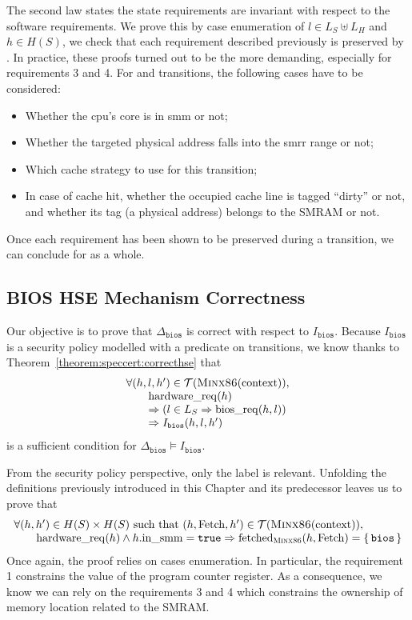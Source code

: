 The second law states the state requirements are invariant with respect to the
software requirements.
%
We prove this by case enumeration of \( l \in L_S \uplus L_H \) and
\( h \in H(S) \), we check that each requirement described
previously is preserved by .
%
In practice, these proofs turned out to be the more demanding, especially for
requirements 3 and 4.
%
For  and  transitions, the following cases have to be
considered:
%
\begin{itemize}
\item Whether the \ac{cpu}'s core is in \ac{smm} or not;
\item Whether the targeted physical address falls into the \ac{smrr} range or
  not;
\item Which cache strategy to use for this transition;
\item In case of cache hit, whether the occupied cache line is tagged ``dirty''
  or not, and whether its tag (a physical address) belongs to the SMRAM or not.
\end{itemize}
%
Once each requirement has been shown to be preserved during a transition, we can
conclude for  as a whole.

\subsection{BIOS HSE Mechanism Correctness}

Our objective is to prove that \( \Delta_{\mathtt{bios}} \) is correct with
respect to \( I_{\mathtt{bios}} \).
%
Because \( I_{\mathtt{bios}} \) is a security policy modelled with a predicate
on transitions, we know thanks to Theorem~\ref{theorem:speccert:correcthse} that
%
\[
  \begin{array}{l}
    \forall (h, l, h') \in \mathcal{T}(\textsc{Minx86}(\mathrm{context})), \\
    \qquad \mathrm{hardware\_req}(h) \\
    \qquad \Rightarrow (l \in L_S \Rightarrow \mathrm{bios\_req}(h, l)) \\
    \qquad \Rightarrow I_{\mathtt{bios}}(h, l, h')
  \end{array}
\]
%
is a sufficient condition for
\( \Delta_{\mathtt{bios}} \models I_{\mathtt{bios}} \).

From the security policy perspective, only the  label is relevant.
%
Unfolding the definitions previously introduced in this Chapter and its
predecessor leaves us to prove that
%
\[
  \begin{array}{l}
    \forall (h, h') \in H(S) \times H(S) \text{ such that } (h, \mathrm{Fetch}, h')
    \in \mathcal{T}(\textsc{Minx86}(\mathrm{context})), \\
    \qquad \mathrm{hardware\_req}(h) \wedge h.\mathrm{in\_smm} = \mathtt{true}
    \Rightarrow \mathrm{fetched}_{\textsc{Minx86}}(h, \mathrm{Fetch}) =
    \{\,\mathtt{bios}\,\}
  \end{array}
\]
%
Once again, the proof relies on cases enumeration.
%
In particular, the requirement 1 constrains the value of the program counter
register.
%
As a consequence, we know we can rely on the requirements 3 and 4 which
constrains the ownership of memory location related to the SMRAM.

